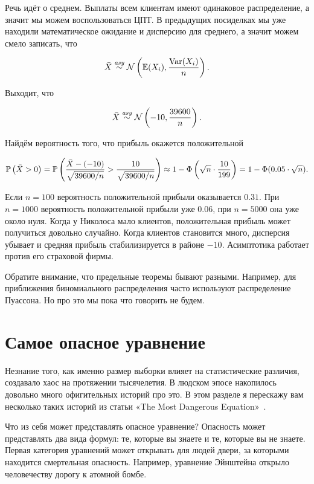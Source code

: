 \documentclass[12pt, a4paper, oneside]{article}
\begin{document}
\begin{sol}
Речь идёт о среднем. Выплаты всем клиентам имеют одинаковое распределение, а значит мы можем воспользоваться ЦПТ. В предыдущих посиделках мы уже находили математическое ожидание и дисперсию для среднего, а значит можем смело записать, что 

\[
\bar{X} \overset{\text{\textit{asy}}}{\sim} \mathcal{N} \left(\mathbb{E}(X_i), \frac{\operatorname{Var}(X_i)}{n} \right).
\] 

Выходит, что 

\[
\bar{X} \overset{\text{\textit{asy}}}{\sim} \mathcal{N} \left(-10, \frac{39600}{n} \right).
\] 

Найдём вероятность того, что прибыль окажется положительной

\[
\mathbb{P} \left(\bar{X} > 0 \right) = \mathbb{P} \left(\frac{\bar{X} - (-10)}{\sqrt{39600/n}} > \frac{10}{\sqrt{39600/n}} \right) \approx 1 - \Phi\left( \sqrt{n} \cdot \frac{10}{199} \right) = 1 - \Phi ( 0.05 \cdot \sqrt{n}).
\]

Если $n=100$ вероятность положительной прибыли оказывается $0.31$. При $n=1000$ вероятность положительной прибыли уже $0.06$, при $n=5000$ она уже около нуля. Когда у Николоса мало клиентов, положительная прибыль может получиться довольно случайно. Когда клиентов становится много, дисперсия убывает и средняя прибыль стабилизируется в районе $-10$. Асимптотика работает против его страховой фирмы. 
\end{sol}

Обратите внимание, что предельные теоремы бывают разными. Например, для приближения биномиального распределения часто используют распределение Пуассона. Но про это мы пока что говорить не будем. 

\section{Самое опасное уравнение}

Незнание того, как именно размер выборки влияет на статистические различия, создавало хаос на протяжении тысячелетия. В людском эпосе накопилось довольно много офигительных историй про это. В этом разделе я перескажу вам несколько таких историй из статьи «The Most Dangerous Equation»~\cite{ref:zmde}. 

Что из себя может представлять опасное уравнение? Опасность может представлять два вида формул: те, которые вы знаете и те, которые вы не знаете. Первая категория уравнений может открывать для людей двери, за которыми находится смертельная опасность. Например, уравнение Эйнштейна открыло человечеству дорогу к атомной бомбе. 
\end{document}

